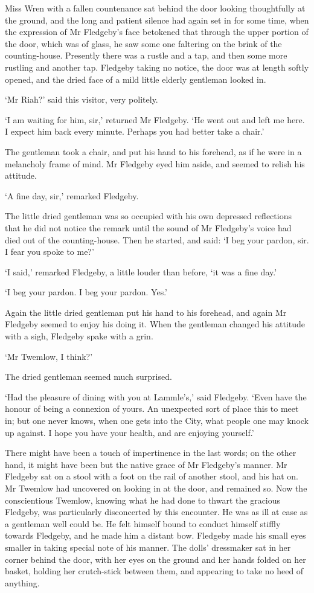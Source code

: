 Miss Wren with a fallen countenance sat behind the door looking
thoughtfully at the ground, and the long and patient silence had
again set in for some time, when the expression of Mr Fledgeby’s face
betokened that through the upper portion of the door, which was of
glass, he saw some one faltering on the brink of the counting-house.
Presently there was a rustle and a tap, and then some more rustling and
another tap. Fledgeby taking no notice, the door was at length softly
opened, and the dried face of a mild little elderly gentleman looked in.

‘Mr Riah?’ said this visitor, very politely.

‘I am waiting for him, sir,’ returned Mr Fledgeby. ‘He went out and left
me here. I expect him back every minute. Perhaps you had better take a
chair.’

The gentleman took a chair, and put his hand to his forehead, as if
he were in a melancholy frame of mind. Mr Fledgeby eyed him aside, and
seemed to relish his attitude.

‘A fine day, sir,’ remarked Fledgeby.

The little dried gentleman was so occupied with his own depressed
reflections that he did not notice the remark until the sound of Mr
Fledgeby’s voice had died out of the counting-house. Then he started,
and said: ‘I beg your pardon, sir. I fear you spoke to me?’

‘I said,’ remarked Fledgeby, a little louder than before, ‘it was a fine
day.’

‘I beg your pardon. I beg your pardon. Yes.’

Again the little dried gentleman put his hand to his forehead, and again
Mr Fledgeby seemed to enjoy his doing it. When the gentleman changed his
attitude with a sigh, Fledgeby spake with a grin.

‘Mr Twemlow, I think?’

The dried gentleman seemed much surprised.

‘Had the pleasure of dining with you at Lammle’s,’ said Fledgeby. ‘Even
have the honour of being a connexion of yours. An unexpected sort of
place this to meet in; but one never knows, when one gets into the City,
what people one may knock up against. I hope you have your health, and
are enjoying yourself.’

There might have been a touch of impertinence in the last words; on the
other hand, it might have been but the native grace of Mr Fledgeby’s
manner. Mr Fledgeby sat on a stool with a foot on the rail of another
stool, and his hat on. Mr Twemlow had uncovered on looking in at the
door, and remained so. Now the conscientious Twemlow, knowing what he
had done to thwart the gracious Fledgeby, was particularly disconcerted
by this encounter. He was as ill at ease as a gentleman well could be.
He felt himself bound to conduct himself stiffly towards Fledgeby,
and he made him a distant bow. Fledgeby made his small eyes smaller
in taking special note of his manner. The dolls’ dressmaker sat in her
corner behind the door, with her eyes on the ground and her hands folded
on her basket, holding her crutch-stick between them, and appearing to
take no heed of anything.

